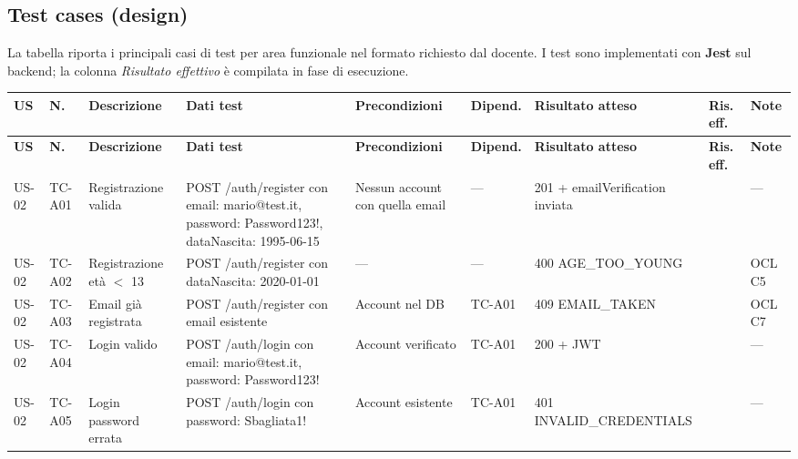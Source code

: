 \documentclass[11pt,a4paper]{article}
\renewcommand{\arraystretch}{1.25}
\begin{document}
  \subsection{Test cases (design)}
  La tabella riporta i principali casi di test per area funzionale nel formato richiesto dal
  docente. I test sono implementati con \textbf{Jest} sul backend; la colonna \emph{Risultato
  effettivo} \`{e} compilata in fase di esecuzione.

  \begingroup
  \scriptsize
  \setlength{\tabcolsep}{2pt}
  \renewcommand{\arraystretch}{1.1}
  \begin{longtable}{p{0.9cm} p{1.1cm} p{2.6cm} p{3.0cm} p{1.8cm} p{1.0cm} p{2.4cm} p{0.9cm} p{1.3cm}}
  \toprule
  \rowcolor{headerBg}
  \color{white}\textbf{US} &
  \color{white}\textbf{N.} &
  \color{white}\textbf{Descrizione} &
  \color{white}\textbf{Dati test} &
  \color{white}\textbf{Precondizioni} &
  \color{white}\textbf{Dipend.} &
  \color{white}\textbf{Risultato atteso} &
  \color{white}\textbf{Ris. eff.} &
  \color{white}\textbf{Note} \\
  \midrule
  \endfirsthead
  \toprule
  \rowcolor{headerBg}
  \color{white}\textbf{US} &
  \color{white}\textbf{N.} &
  \color{white}\textbf{Descrizione} &
  \color{white}\textbf{Dati test} &
  \color{white}\textbf{Precondizioni} &
  \color{white}\textbf{Dipend.} &
  \color{white}\textbf{Risultato atteso} &
  \color{white}\textbf{Ris. eff.} &
  \color{white}\textbf{Note} \\
  \midrule
  \endhead
  US-02 & TC-A01 & Registrazione valida & POST /auth/register con email: mario@test.it, password: Password123!, dataNascita: 1995-06-15 & Nessun account con quella email & --- & 201 + emailVerification inviata & & --- \\
  \rowcolor{rowAlt}
  US-02 & TC-A02 & Registrazione et\`{a} $<$ 13 & POST /auth/register con dataNascita: 2020-01-01 & --- & --- & 400 AGE\_TOO\_YOUNG & & OCL C5 \\
  US-02 & TC-A03 & Email gi\`{a} registrata & POST /auth/register con email esistente & Account nel DB & TC-A01 & 409 EMAIL\_TAKEN & & OCL C7 \\
  \rowcolor{rowAlt}
  US-02 & TC-A04 & Login valido & POST /auth/login con email: mario@test.it, password: Password123! & Account verificato & TC-A01 & 200 + JWT & & --- \\
  US-02 & TC-A05 & Login password errata & POST /auth/login con password: Sbagliata1! & Account esistente & TC-A01 & 401 INVALID\_CREDENTIALS & & --- \\

\end{longtable}
\end{document}
